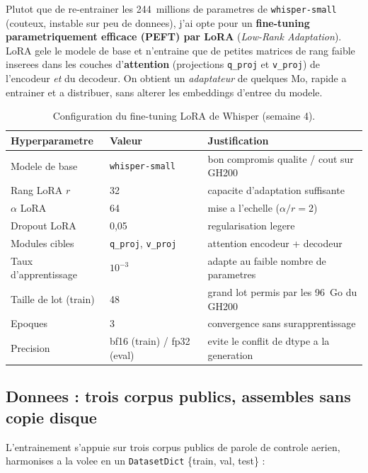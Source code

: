 \documentclass[11pt,a4paper]{article}
\begin{document}
Plutot que de re-entrainer les 244~millions de parametres de \texttt{whisper-small}
(couteux, instable sur peu de donnees), j'ai opte pour un \textbf{fine-tuning
parametriquement efficace (PEFT) par LoRA} (\emph{Low-Rank Adaptation}). LoRA gele
le modele de base et n'entraine que de petites matrices de rang faible inserees
dans les couches d'\textbf{attention} (projections \texttt{q\_proj} et
\texttt{v\_proj}) de l'encodeur \emph{et} du decodeur. On obtient un \emph{adaptateur}
de quelques Mo, rapide a entrainer et a distribuer, sans alterer les embeddings
d'entree du modele.

\begin{table}[h]
\centering
\small
\begin{tabular}{>{\raggedright}p{4.3cm} l p{6.0cm}}
\toprule
\rowcolor{lightgray}\textbf{Hyperparametre} & \textbf{Valeur} & \textbf{Justification}\\
\midrule
Modele de base & \texttt{whisper-small} & bon compromis qualite / cout sur GH200\\
Rang LoRA $r$ & 32 & capacite d'adaptation suffisante\\
$\alpha$ LoRA & 64 & mise a l'echelle ($\alpha/r = 2$)\\
Dropout LoRA & 0,05 & regularisation legere\\
Modules cibles & \texttt{q\_proj}, \texttt{v\_proj} & attention encodeur + decodeur\\
Taux d'apprentissage & $10^{-3}$ & adapte au faible nombre de parametres\\
Taille de lot (train) & 48 & grand lot permis par les 96~Go du GH200\\
Epoques & 3 & convergence sans surapprentissage\\
Precision & bf16 (train) / fp32 (eval) & evite le conflit de dtype a la generation\\
\bottomrule
\end{tabular}
\caption{Configuration du fine-tuning LoRA de Whisper (semaine 4).}
\end{table}

\subsection{Donnees : trois corpus publics, assembles sans copie disque}

L'entrainement s'appuie sur trois corpus publics de parole de controle aerien,
harmonises a la volee en un \texttt{DatasetDict} \{train, val, test\} :
\end{document}
